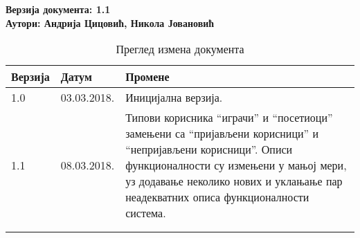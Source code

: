 \noindent
\textbf{Верзија документа: 1.1} \\
\textbf{Аутори: Андрија Цицовић, Никола Јовановић}

\begin{table}[h!]
\centering
\small
	
	\begin{tabular}{ || m{} | m{} | m{} || }
	\hline
	\textbf{Верзија} & \textbf{Датум} & \textbf{Промене} \\
	\hline
	\hline
	1.0 & 03.03.2018. & 
	Иницијална верзија. \\
	\hline
	1.1 & 08.03.2018. & 
	Типови корисника ``играчи'' и ``посетиоци'' замењени са ``пријављени корисници'' и 
	``непријављени корисници''. Описи функционалности су измењени у мањој мери, уз
	додавање неколико нових и уклањање пар неадекватних описа функционалности система.  \\
	\hline
	& & \\
	\hline
	& & \\
	\hline
	\end{tabular}
	\caption{Преглед измена документа}
	\label{table:1}
		
\end{table}
\newpage
